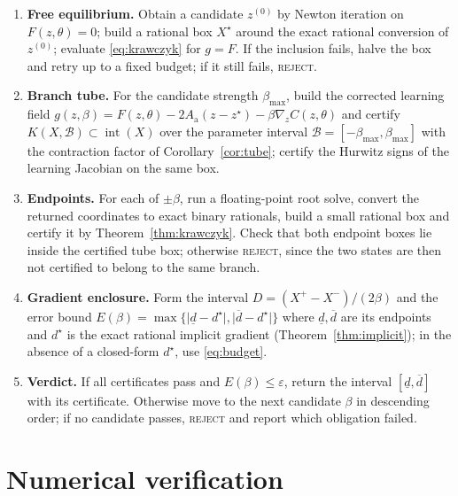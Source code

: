 \documentclass[11pt]{article}
\theoremstyle{definition}
\theoremstyle{remark}
\newcommand{\abs}[1]{\lvert #1 \rvert}
\newcommand{\grad}{\nabla}
\newcommand{\betamax}{\beta_{\max}}
\begin{document}
\begin{algorithm}[t]
\caption{Certified finite-perturbation gradient update (fail-closed)}
\label{alg:certified}
\begin{enumerate}
\item \textbf{Free equilibrium.} Obtain a candidate $z^{(0)}$ by Newton iteration on
$F(z,\theta)=0$; build a rational box $X^\star$ around the exact rational conversion of
$z^{(0)}$; evaluate \eqref{eq:krawczyk} for $g = F$. If the inclusion fails, halve the box and
retry up to a fixed budget; if it still fails, \textsc{reject}.
\item \textbf{Branch tube.} For the candidate strength $\betamax$, build the corrected learning
field $g(z,\beta) = F(z,\theta) - 2A_{\mathrm a}(z-z^\star) - \beta \grad_z C(z,\theta)$ and
certify $K(X,\mathcal{B}) \subset \operatorname{int}(X)$ over the parameter interval
$\mathcal{B} = [-\betamax, \betamax]$ with the contraction factor of
Corollary~\ref{cor:tube}; certify the Hurwitz signs of the learning Jacobian on the same box.
\item \textbf{Endpoints.} For each of $\pm\beta$, run a floating-point root solve, convert the
returned coordinates to exact binary rationals, build a small rational box and certify it by
Theorem~\ref{thm:krawczyk}. Check that both endpoint boxes lie inside the certified tube box;
otherwise \textsc{reject}, since the two states are then not certified to belong to the same
branch.
\item \textbf{Gradient enclosure.} Form the interval
$D = (X^{+} - X^{-})/(2\beta)$ and the error bound
$E(\beta) = \max\{\abs{\underline d - d^\star}, \abs{\overline d - d^\star}\}$ where $\underline d,
\overline d$ are its endpoints and $d^\star$ is the exact rational implicit gradient
(Theorem~\ref{thm:implicit}); in the absence of a closed-form $d^\star$, use
\eqref{eq:budget}.
\item \textbf{Verdict.} If all certificates pass and $E(\beta) \le \varepsilon$, return the
interval $[\underline d,\overline d]$ with its certificate. Otherwise move to the next candidate
$\beta$ in descending order; if no candidate passes, \textsc{reject} and report which
obligation failed.
\end{enumerate}
\end{algorithm}

\section{Numerical verification}\label{sec:results}
\end{document}
